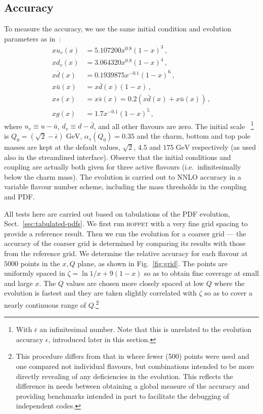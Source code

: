 \documentclass[12pt]{article}
\newcommand{\lp}{\left(}
\newcommand{\rp}{\right)}
\newcommand{\GeV}{\;\mathrm{GeV}}
\newcommand{\as}{\alpha_s}
\newcommand{\ie}{i.e.\ }
\newcommand{\hoppet}{\textsc{hoppet}\xspace}
\begin{document}
\subsection{Accuracy}
\label{sec:Accuracy}
To measure the accuracy, 
we use the same initial condition and evolution parameters as
in~\cite{Benchmarks}:
\begin{subequations}
  \label{eq:init}
  \begin{align}
    x u_v(x)   &= 5.107200 x^{0.8} (1-x)^3\,,\\
    x d_v(x)   &= 3.064320 x^{0.8} (1-x)^4\,,\\
    x\bar d(x) &= 0.1939875 x^{-0.1} (1-x)^6\,,\\
    x\bar u(x) &= x\bar d(x) (1-x)\,,\\
    x     s(x) &= x\bar s(x) = 0.2(x\bar d(x) + x\bar u(x))\,,\\
    x g(x) &= 1.7 x^{-0.1} (1-x)^5\,,
  \end{align}
\end{subequations}
where $u_v \equiv u - \bar u$, $d_v \equiv d - \bar d$, and all other
flavours are zero. The initial scale~
\footnote{With $\bar{\epsilon}$ an infinitesimal number. Note that
this is unrelated to the evolution accuracy $\epsilon$, introduced later
in this section.} is $Q_0 = \lp \sqrt{2}-\bar{\epsilon}
\rp \GeV$,
$\as(Q_0) = 0.35$ and the charm, bottom and top pole masses are kept
at the default values, $\sqrt{2}$, $4.5$ and $175\GeV$ respectively
(as used also in the streamlined interface).
Observe that the initial conditions 
and coupling are actually both given for three active
flavours (\ie infinitesimally below the charm mass). The evolution is
carried out to NNLO accuracy in a variable flavour number scheme,
including the mass thresholds in the coupling and PDF.

All tests here are carried out based on tabulations of the PDF
evolution, Sect.~\ref{sec:tabulated-pdfs}.
%
We first run \hoppet with a very fine grid spacing to provide a
reference result. Then we run the evolution for a coarser grid ---
the accuracy of the coarser grid is determined by comparing its
results with those from the reference grid. We determine the relative
accuracy for each flavour at $5000$ points in the $x, Q$ plane, as
shown in Fig.~\ref{fig:grid}. The points are uniformly spaced in
$\zeta = \ln 1/x + 9(1-x)$ so as to obtain fine coverage at small and
large $x$. The $Q$ values are chosen more closely spaced at low $Q$
where the evolution is fastest and they are taken slightly correlated
with $\zeta$ so as to cover a nearly continuous range of
$Q$.\footnote{This procedure differs from that in \cite{Benchmarks}
  where fewer (500) points were used and one compared not individual
  flavours, but combinations intended to be more directly revealing of
  any deficiencies in the evolution. This reflects the difference in
  needs between obtaining a global measure of the accuracy and
  providing benchmarks intended in part to facilitate the debugging of
  independent codes.}
\end{document}
